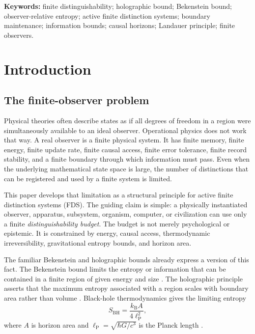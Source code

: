 \documentclass[10pt,a4paper,twocolumn,aps,prl]{revtex4-2}
\newcommand{\ellP}{\ell_{\mathrm P}}
\newcommand{\kB}{k_{\mathrm B}}
\begin{document}
\maketitle

\noindent\textbf{Keywords:} finite distinguishability; holographic bound; Bekenstein bound; observer-relative entropy; active finite distinction systems; boundary maintenance; information bounds; causal horizons; Landauer principle; finite observers.

\section{Introduction}

\subsection{The finite-observer problem}

Physical theories often describe states as if all degrees of freedom in a region were simultaneously available to an ideal observer. Operational physics does not work that way. A real observer is a finite physical system. It has finite memory, finite energy, finite update rate, finite causal access, finite error tolerance, finite record stability, and a finite boundary through which information must pass. Even when the underlying mathematical state space is large, the number of distinctions that can be registered and used by a finite system is limited.

This paper develops that limitation as a structural principle for active finite distinction systems (FDS). The guiding claim is simple: a physically instantiated observer, apparatus, subsystem, organism, computer, or civilization can use only a finite \emph{distinguishability budget}. The budget is not merely psychological or epistemic. It is constrained by energy, causal access, thermodynamic irreversibility, gravitational entropy bounds, and horizon area.

The familiar Bekenstein and holographic bounds already express a version of this fact. The Bekenstein bound limits the entropy or information that can be contained in a finite region of given energy and size \cite{bekenstein1981,bekenstein2003}. The holographic principle asserts that the maximum entropy associated with a region scales with boundary area rather than volume \cite{thooft1993,susskind1995,bousso2002}. Black-hole thermodynamics gives the limiting entropy
\begin{equation}
S_{\mathrm{BH}}=\frac{\kB A}{4\ellP^2},
\label{eq:bh-entropy}
\end{equation}
where $A$ is horizon area and $\ellP=\sqrt{\hbar G/c^3}$ is the Planck length \cite{bekenstein1973,hawking1975}.
\end{document}
